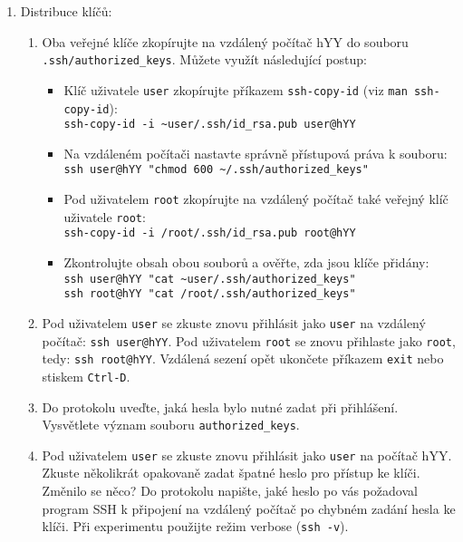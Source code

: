 \documentclass[a4paper,11pt]{article}
\begin{document}
\begin{enumerate}
  \item Distribuce klíčů:
    \begin{enumerate}
      \item Oba veřejné klíče zkopírujte na vzdálený počítač hYY do souboru \verb|.ssh/authorized_keys|. Můžete využít následující postup:
        \begin{itemize}
          \item Klíč uživatele {\tt user} zkopírujte příkazem {\tt ssh-copy-id} (viz {\tt man ssh-copy-id}): \\
            {\verb&ssh-copy-id -i ~user/.ssh/id_rsa.pub user@hYY&}
          \item Na vzdáleném počítači nastavte správně přístupová práva k souboru:\\
            {\verb&ssh user@hYY "chmod 600 ~/.ssh/authorized_keys"&} 
          \item Pod uživatelem {\tt root} zkopírujte na vzdálený počítač také veřejný klíč uživatele {\tt root}: \\
            {\verb&ssh-copy-id -i /root/.ssh/id_rsa.pub root@hYY&}
          \item Zkontrolujte obsah obou souborů a ověřte, zda jsou klíče přidány: \\
            {\verb&ssh user@hYY "cat ~user/.ssh/authorized_keys"&} \\
            {\verb&ssh root@hYY "cat /root/.ssh/authorized_keys"&}
        \end{itemize}
      \item Pod uživatelem {\tt user} se zkuste znovu přihlásit jako \texttt{user} na vzdálený počítač: \texttt{ssh user@hYY}. Pod uživatelem {\tt root} se znovu přihlaste jako {\tt root}, tedy: \texttt{ssh root@hYY}.
      Vzdálená sezení opět ukončete příkazem {\tt exit} nebo stiskem {\tt Ctrl-D}.

      \item Do protokolu uveďte, jaká hesla bylo nutné zadat při přihlášení. Vysvětlete význam souboru \texttt{authorized\_keys}.
      \item Pod uživatelem \texttt{user} se zkuste znovu přihlásit jako \texttt{user} na počítač hYY. Zkuste několikrát opakovaně zadat špatné heslo pro přístup ke klíči.
      Změnilo se něco?
      Do protokolu napište, jaké heslo po vás požadoval program SSH k připojení na vzdálený počítač po chybném zadání hesla ke klíči. Při experimentu použijte režim verbose (\texttt{ssh -v}).
    \end{enumerate}


\end{enumerate}
\end{document}

